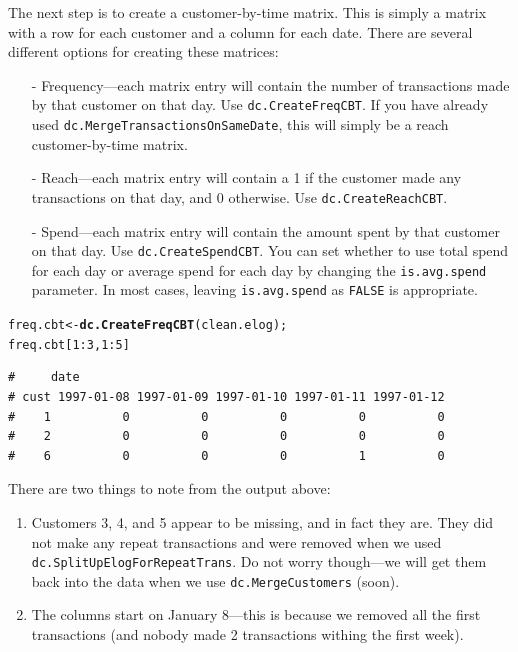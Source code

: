 \documentclass[10pt, letterpaper, onecolumn, oneside, final]{article}\usepackage[]{graphicx}\usepackage[]{color}
\makeatletter
\newcommand{\hlnum}[1]{\textcolor[rgb]{0.686,0.059,0.569}{#1}}%
\newcommand{\hlopt}[1]{\textcolor[rgb]{0,0,0}{#1}}%
\newcommand{\hlstd}[1]{\textcolor[rgb]{0.345,0.345,0.345}{#1}}%
\newcommand{\hlkwb}[1]{\textcolor[rgb]{0.69,0.353,0.396}{#1}}%
\newcommand{\hlkwd}[1]{\textcolor[rgb]{0.737,0.353,0.396}{\textbf{#1}}}%
\newenvironment{kframe}{%
 \def\at@end@of@kframe{}%
 \ifinner\ifhmode%
  \def\at@end@of@kframe{\end{minipage}}%
  \begin{minipage}{\columnwidth}%
 \fi\fi%
 \def\FrameCommand##1{\hskip\@totalleftmargin \hskip-\fboxsep
 \colorbox{shadecolor}{##1}\hskip-\fboxsep
     \hskip-\linewidth \hskip-\@totalleftmargin \hskip\columnwidth}%
 \MakeFramed {\advance\hsize-\width
   \@totalleftmargin\z@ \linewidth\hsize
   \@setminipage}}%
 {\par\unskip\endMakeFramed%
 \at@end@of@kframe}
\newenvironment{knitrout}{}{} %
\makeatother
\begin{document}
The next step is to create a customer-by-time matrix. This is simply a
matrix with a row for each customer and a column for each date. There
are several different options for creating these matrices:
\begin{itemize}
  \item[-] Frequency---each matrix entry will contain the number of
    transactions made by that customer on that day. Use
    \texttt{dc.CreateFreqCBT}. If you have already used
    \texttt{dc.MergeTransactionsOnSameDate}, this will simply be a
    reach customer-by-time matrix.
  \item[-] Reach---each matrix entry will contain a 1 if the customer
    made any transactions on that day, and 0 otherwise. Use
    \texttt{dc.CreateReachCBT}.
  \item[-] Spend---each matrix entry will contain the amount spent by
    that customer on that day. Use \texttt{dc.CreateSpendCBT}. You can
    set whether to use total spend for each day or average spend for
    each day by changing the \texttt{is.avg.spend} parameter. In most
    cases, leaving \texttt{is.avg.spend} as \texttt{FALSE} is appropriate.
\end{itemize}
 
\begin{knitrout}
\color{fgcolor}\begin{kframe}
\begin{alltt}
\hlstd{freq.cbt} \hlkwb{<-} \hlkwd{dc.CreateFreqCBT}\hlstd{(clean.elog);}
\hlstd{freq.cbt[}\hlnum{1}\hlopt{:}\hlnum{3}\hlstd{,}\hlnum{1}\hlopt{:}\hlnum{5}\hlstd{]}
\end{alltt}
\begin{verbatim}
#     date
# cust 1997-01-08 1997-01-09 1997-01-10 1997-01-11 1997-01-12
#    1          0          0          0          0          0
#    2          0          0          0          0          0
#    6          0          0          0          1          0
\end{verbatim}
\end{kframe}
\end{knitrout}

There are two things to note from the output above:
\begin{enumerate}
  \item Customers 3, 4, and 5 appear to be missing, and in fact they
    are. They did not make any repeat transactions and were removed
    when we used \texttt{dc.SplitUpElogForRepeatTrans}. Do not worry
    though---we will get them back into the data when we use
    \texttt{dc.MergeCustomers} (soon).
  \item The columns start on January 8---this is because we removed
    all the first transactions (and nobody made 2 transactions withing
    the first week).
\end{enumerate}
\end{document}
